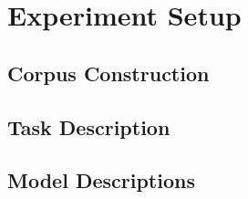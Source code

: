 \section{Experiment Setup}\label{experimentSetup}

\subsection{Corpus Construction}\label{corpusConstruction}

\subsection{Task Description}\label{taskDescription}

\subsection{Model Descriptions}\label{modelDescriptions}
